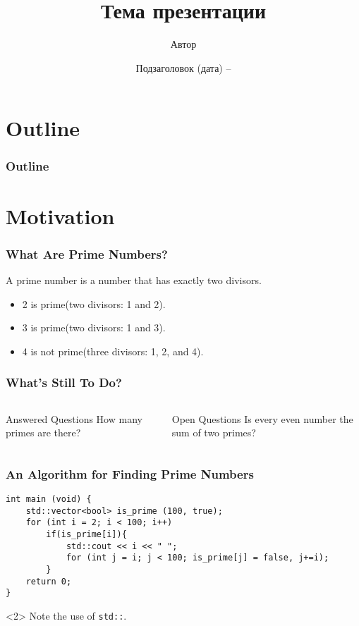 \documentclass[aspectratio=169]{beamer}
\title{Тема презентации}
\date[ГУАП \the\year{}]{Подзаголовок (дата) -- \the\year{}}
\author[Автор]{Автор}
\begin{document}
\begin{frame}[plain]
    \titlepage
\end{frame}


\section*{Outline}

\begin{frame} 
    \frametitle{Outline} 
    \tableofcontents 
\end{frame}


\section{Motivation}

\begin{frame}[t]
    \frametitle{What Are Prime Numbers?} 
    \begin{definition} 
        A \alert{prime number} is a number that has exactly two divisors. 
    \end{definition} 

    \begin{example} 
        \begin{itemize} 
        \item2 is prime(two divisors: 1 and 2). 
        \item3 is prime(two divisors: 1 and 3). 
        \item4 is not prime(\alert{three} divisors: 1, 2, and 4). 
        \end{itemize} 
    \end{example} 
\end{frame}

\begin{frame}
    \frametitle{What’s Still To Do?} 
    \begin{columns}[t]
        \begin{block}{Answered Questions} 
            How many primes are there? 
        \end{block} 
        \begin{block}{Open Questions} 
            Is every even number the sum of two primes? 
        \end{block} 
    \end{columns}
\end{frame}

\begin{frame}[fragile=singleslide]
    \frametitle{An Algorithm for Finding Prime Numbers}

    \begin{verbatim}
int main (void) {
    std::vector<bool> is_prime (100, true);
    for (int i = 2; i < 100; i++)
        if(is_prime[i]){
            std::cout << i << " ";
            for (int j = i; j < 100; is_prime[j] = false, j+=i);
        }
    return 0;
}
    \end{verbatim}

    \begin{uncoverenv}<2>
        Note the use of \verb|std::|.        
    \end{uncoverenv}
    
\end{frame}
\end{document}

